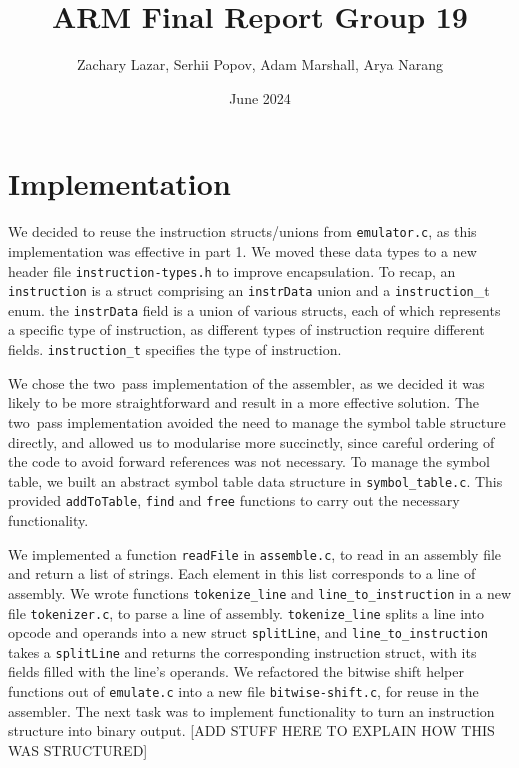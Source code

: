 \documentclass[11pt]{article}
\title{ARM Final Report Group 19}
\author{Zachary Lazar, Serhii Popov, Adam Marshall, Arya Narang}
\date{June 2024}
\begin{document}
\maketitle

\section{Implementation}

We decided to reuse the instruction structs/unions from \texttt{emulator.c}, as this implementation was effective in part 1. We moved these data types to a new header file \texttt{instruction-types.h} to improve encapsulation. To recap, an \texttt{instruction} is a struct comprising an \texttt{instrData} union and a \texttt{instruction}\_t enum. the \texttt{instrData} field is a union of various structs, each of which represents a specific type of instruction, as different types of instruction require different fields. \texttt{instruction\_t} specifies the type of instruction.

We chose the two~pass implementation of the assembler, as we decided it was likely to be more straightforward and result in a more effective solution. The two~pass implementation avoided the need to manage the symbol table structure directly, and allowed us to modularise more succinctly, since careful ordering of the code to avoid forward references was not necessary. To manage the symbol table, we built an abstract symbol table data structure in \texttt{symbol\_table.c}. This provided \texttt{addToTable},  \texttt{find} and \texttt{free} functions to carry out the necessary functionality.

We implemented a function \texttt{readFile} in \texttt{assemble.c}, to read in an assembly file and return a list of strings. Each element in this list corresponds to a line of assembly. We wrote functions \texttt{tokenize\_line} and \texttt{line\_to\_instruction} in a new file \texttt{tokenizer.c}, to parse a line of assembly. \texttt{tokenize\_line} splits a line into opcode and operands into a new struct \texttt{splitLine}, and \texttt{line\_to\_instruction} takes a \texttt{splitLine} and returns the corresponding instruction struct, with its fields filled with the line's operands. We refactored the bitwise shift helper functions out of \texttt{emulate.c} into a new file \texttt{bitwise-shift.c}, for reuse in the assembler. The next task was to implement functionality to turn an instruction structure into binary output.
[ADD STUFF HERE TO EXPLAIN HOW THIS WAS STRUCTURED]
\end{document}
